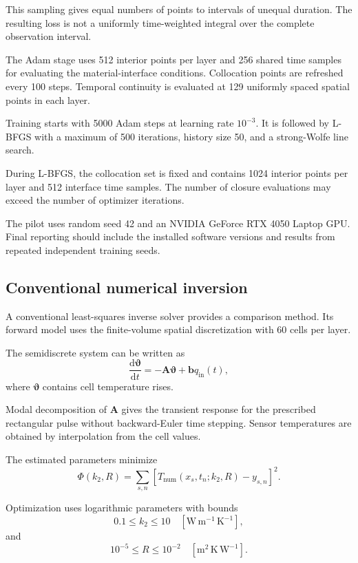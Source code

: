\documentclass[11pt,a4paper]{article}
\newcommand{\dd}{\mathrm{d}}
\begin{document}
This sampling gives equal numbers of points to intervals
of unequal duration.
The resulting loss is not a uniformly time-weighted integral
over the complete observation interval.

The Adam stage uses 512 interior points per layer and
256 shared time samples for evaluating the material-interface
conditions. Collocation points are refreshed every 100 steps.
Temporal continuity is evaluated at 129 uniformly spaced
spatial points in each layer.

Training starts with 5000 Adam steps at learning rate
$10^{-3}$.
It is followed by L-BFGS with a maximum of 500 iterations,
history size 50, and a strong-Wolfe line search.

During L-BFGS, the collocation set is fixed and contains
1024 interior points per layer and 512 interface time samples.
The number of closure evaluations may exceed the number of
optimizer iterations.

The pilot uses random seed 42 and an NVIDIA GeForce
RTX 4050 Laptop GPU.
Final reporting should include the installed software
versions and results from repeated independent training seeds.

\subsection{Conventional numerical inversion}

A conventional least-squares inverse solver provides a
comparison method.
Its forward model uses the finite-volume spatial
discretization with 60 cells per layer.

The semidiscrete system can be written as
\begin{equation}
\frac{\dd\boldsymbol{\vartheta}}{\dd t}
=
-\mathbf{A}\boldsymbol{\vartheta}
+\mathbf{b}q_{\mathrm{in}}(t),
\end{equation}
where $\boldsymbol{\vartheta}$ contains cell temperature
rises.

Modal decomposition of $\mathbf{A}$ gives the transient
response for the prescribed rectangular pulse without
backward-Euler time stepping.
Sensor temperatures are obtained by interpolation from the
cell values.

The estimated parameters minimize
\begin{equation}
\Phi(k_2,R)
=
\sum_{s,n}
\left[
T_{\mathrm{num}}(x_s,t_n;k_2,R)-y_{s,n}
\right]^2.
\end{equation}

Optimization uses logarithmic parameters with bounds
\begin{equation}
0.1\leq k_2\leq10
\quad
[\mathrm{W\,m^{-1}\,K^{-1}}],
\end{equation}
and
\begin{equation}
10^{-5}\leq R\leq10^{-2}
\quad
[\mathrm{m^2\,K\,W^{-1}}].
\end{equation}
\end{document}
